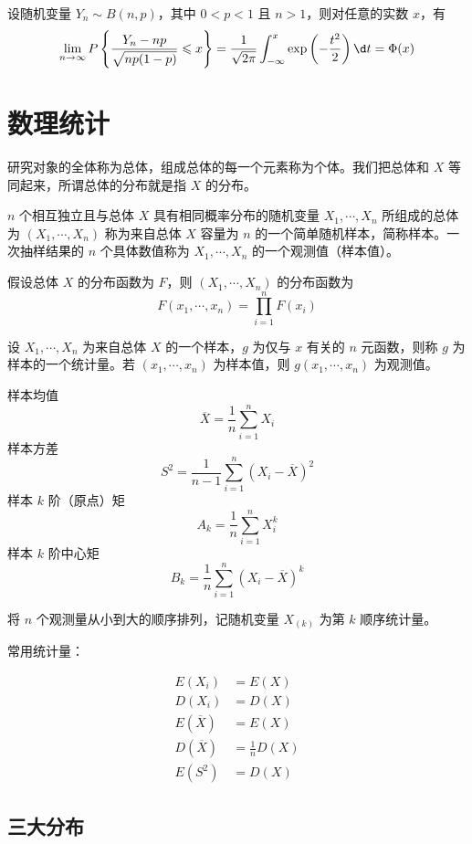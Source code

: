 \begin{theorem}
	设随机变量 $Y_n \sim B(n, p)$，其中 $0 < p < 1$ 且 $n > 1$，则对任意的实数 $x$，有
	\[ \lim_{n \to \infty} P\left\{ \frac{Y_n - np}{\sqrt{np(1 - p)}} \leqslant x \right\} = \frac{1}{\sqrt{2 \pi}} \int_{-\infty}^x \exp\left(-\frac{t^2}{2}\right) \d t = \Phi(x)  \]
\end{theorem}

\section{数理统计}

研究对象的全体称为总体，组成总体的每一个元素称为个体。我们把总体和 $X$ 等同起来，所谓总体的分布就是指 $X$ 的分布。

$n$ 个相互独立且与总体 $X$ 具有相同概率分布的随机变量 $X_1, \cdots, X_n$ 所组成的总体为 $(X_1, \cdots, X_n)$ 称为来自总体 $X$ 容量为 $n$ 的一个简单随机样本，简称样本。一次抽样结果的 $n$ 个具体数值称为 $X_1, \cdots, X_n$ 的一个观测值（样本值）。

假设总体 $X$ 的分布函数为 $F$，则 $(X_1, \cdots, X_n)$ 的分布函数为
\[ F(x_1, \cdots, x_n) = \prod_{i=1}^n F(x_i) \]

设 $X_1, \cdots, X_n$ 为来自总体 $X$ 的一个样本，$g$ 为仅与 $x$ 有关的 $n$ 元函数，则称 $g$ 为样本的一个统计量。若 $(x_1, \cdots, x_n)$ 为样本值，则 $g(x_1, \cdots, x_n)$ 为观测值。

样本均值
\[ \overline{X} = \frac{1}{n} \sum_{i=1}^n X_i \]
样本方差
\[ S^2 = \frac{1}{n-1} \sum_{i=1}^n (X_i - \overline{X})^2 \]
样本 $k$ 阶（原点）矩
\[ A_k = \frac{1}{n} \sum_{i=1}^n X_i^k \]
样本 $k$ 阶中心矩
\[ B_k = \frac{1}{n} \sum_{i=1}^n (X_i - \overline{X})^k \]

将 $n$ 个观测量从小到大的顺序排列，记随机变量 $X_{(k)}$ 为第 $k$ 顺序统计量。

常用统计量：

\[
\begin{aligned}
	E(X_i) &= E(X) \\
	D(X_i) &= D(X) \\
	E(\overline{X}) &= E(X) \\
	D(\overline{X}) &= \frac{1}{n} D(X) \\
	E(S^2) &= D(X)
\end{aligned}
\]

\subsection{三大分布}

